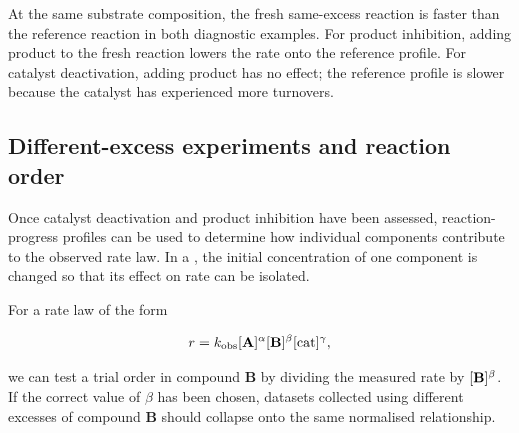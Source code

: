 {{%
  }
}

At the same substrate composition, the fresh same-excess reaction is faster than the reference reaction in both diagnostic examples.
For product inhibition, adding product to the fresh reaction lowers the rate onto the reference profile.
For catalyst deactivation, adding product has no effect; the reference profile is slower because the catalyst has experienced more turnovers.

\subsection{Different-excess experiments and reaction order}

Once catalyst deactivation and product inhibition have been assessed, reaction-progress profiles can be used to determine how individual components contribute to the observed rate law.
In a , the initial concentration of one component is changed so that its effect on rate can be isolated.

For a rate law of the form

\begin{equation}
  r = k_{\mathrm{obs}}
      [\text{\textbf{A}}]^{\alpha}
      [\text{\textbf{B}}]^{\beta}
      [\mathrm{cat}]^{\gamma},
\end{equation}

we can test a trial order in compound \textbf{B} by dividing the measured rate by $[\text{\textbf{B}}]^{\beta}$.
If the correct value of $\beta$ has been chosen, datasets collected using different excesses of compound \textbf{B} should collapse onto the same normalised relationship.

